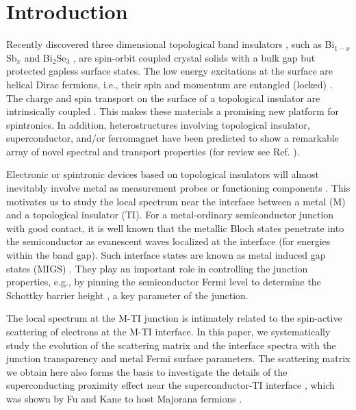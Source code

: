 \documentclass[11pt]{report}
\begin{document}
\section{Introduction}
Recently discovered three dimensional topological band insulators \cite{fu07,moore,roy}, such as Bi$_{1-x}$Sb$_x$ \cite{Hsieh2008} and Bi$_2$Se$_3$ \cite{Xia09,zhang2009,Chen09}, are spin-orbit coupled crystal solids with a bulk gap but protected gapless surface states. The low energy excitations at the surface are helical Dirac fermions, i.e., their spin and momentum are entangled (locked) \cite{Hsieh2009}. The charge and spin transport on the surface of a topological insulator
are intrinsically coupled \cite{burkov}.
This makes these materials a promising new platform for spintronics. In addition, heterostructures involving topological insulator, superconductor, and/or ferromagnet have been predicted to show a remarkable array of novel spectral and transport properties (for review
see Ref. \cite{today,rmp,Qi-zhang-rev}). 

Electronic or spintronic devices based on topological insulators will almost inevitably involve metal as measurement probes or functioning components \cite{yokoyama09}. This motivates us to study the local spectrum near the interface between a metal (M) and a topological insulator (TI). For a metal-ordinary semiconductor junction with good contact, it is well known that the metallic Bloch states penetrate into the semiconductor as evanescent waves localized at the interface (for energies within the band gap). Such interface states are known as metal induced gap states (MIGS) \cite{heine65,cohen}. They play an important role in controlling the junction properties, e.g., by pinning the semiconductor Fermi level to determine the Schottky barrier height \cite{tersoff}, a key parameter of the junction.

The local spectrum at the M-TI junction is intimately related to the spin-active scattering of electrons at the M-TI interface. In this paper, we systematically study the evolution of the scattering matrix and the interface spectra
with the junction transparency and metal Fermi surface parameters. 
The scattering matrix \cite{mrs} we obtain here also forms the basis to investigate the details of the superconducting proximity effect near the superconductor-TI interface \cite{stan}, which was shown by Fu and Kane to host Majorana fermions \cite{majorana}.
\end{document}

